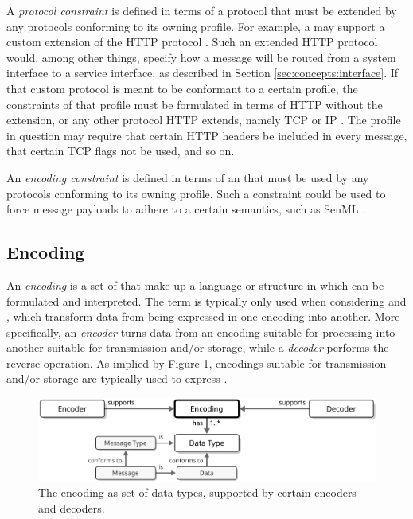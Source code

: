 A \textit{protocol constraint} is defined in terms of a protocol that must be extended by any protocols conforming to its owning profile. 
For example, a  may support a custom extension of the HTTP protocol \cite{fielding2014hypertext}.
Such an extended HTTP protocol would, among other things, specify how a message will be routed from a system interface to a service interface, as described in Section \ref{sec:concepts:interface}.
If that custom protocol is meant to be conformant to a certain profile, the constraints of that profile must be formulated in terms of HTTP without the extension, or any other protocol HTTP extends, namely TCP \cite{postel1981transmission} or IP \cite{deering2017internet}.
The profile in question may require that certain HTTP headers be included in every message, that certain TCP flags not be used, and so on.

An \textit{encoding constraint} is defined in terms of an  that must be used by any protocols conforming to its owning profile.
Such a constraint could be used to force message payloads to adhere to a certain semantics, such as SenML \cite{rfc8428}.

\subsection{Encoding}
\label{sec:concepts:encoding}

An \textit{encoding} is a set of  that make up a language or structure in which  can be formulated and interpreted.
The term is typically only used when considering  and , which transform data from being expressed in one encoding into another.
More specifically, an \textit{encoder} turns data from an encoding suitable for processing into another suitable for transmission and/or storage, while a \textit{decoder} performs the reverse operation.
As implied by Figure \ref{fig:encoding}, encodings suitable for transmission and/or storage are typically used to express .

\begin{figure}[ht!]
  \centering
  \includegraphics[scale=0.9]{figures/encoding}
  \caption{
    The encoding as set of data types, supported by certain encoders and decoders.
  }
  \label{fig:encoding}
\end{figure}

